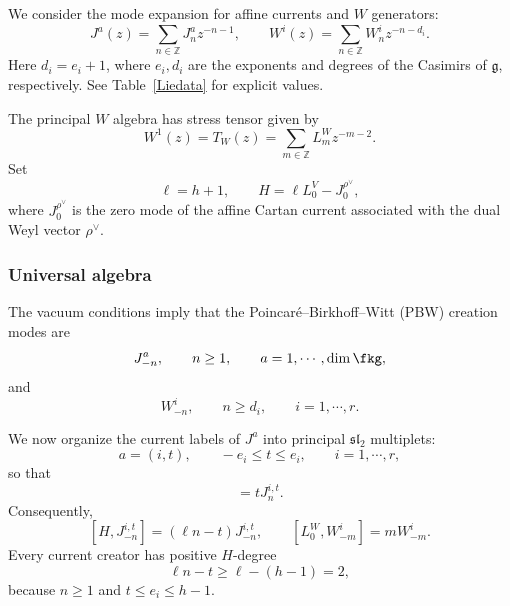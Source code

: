 \documentclass[a4paper,11pt]{article}
\theoremstyle{definition}
\theoremstyle{definition}
\theoremstyle{remark}
\newcommand{\be}{\begin{equation}}
\newcommand{\ee}{\end{equation}}
\begin{document}
We consider the mode expansion for affine currents and $W$ generators: 
\be
J^a(z)=\sum_{n\in\mathbb Z}J^a_nz^{-n-1},
\qquad
W^i(z)=\sum_{n\in\mathbb Z}W^i_n z^{-n-d_i}.
\ee
Here $d_i=e_i+1$, where $e_i,d_i$ are the exponents and degrees of the Casimirs of $ \mathfrak g$, respectively. See Table~\ref{Liedata} for explicit values.  

The principal $W$ algebra has stress tensor given by
\be
W^1(z)=T_W(z)=\sum_{m\in\mathbb Z}L_m^W z^{-m-2}. 
\ee
Set
\be \label{Hfsfsf}
\ell=h+1,\qquad
H=\ell L_0^V-J_0^{\rho^\vee},
\ee
where $J_0^{\rho^\vee}$ is the zero mode of the affine Cartan current associated with the dual Weyl vector $\rho^\vee$.
 

\subsubsection{Universal algebra}
The vacuum conditions imply that the Poincaré--Birkhoff--Witt (PBW) creation modes are
\be
J^a_{-n},\qquad n\ge1, \qquad a=1, \cdots , \dim\fkg,
\ee
and
\be
W^i_{-n},\qquad n\ge d_i, \qquad i=1, \cdots, r.
\ee
 
We now organize the current labels  of $J^a$ into principal $ \mathfrak{sl}_2$ multiplets:
\be
a=(i,t),\qquad -e_i\le t\le e_i, \qquad i=1, \cdots, r,
\ee
so that
\be
[J_0^{\rho^\vee},J_n^{i,t}]=tJ_n^{i,t}.
\ee
Consequently,
\be\label{HJLW}
[H,J^{i,t}_{-n}]= (\ell n-t)J^{i,t}_{-n},
\qquad
[L^W_0,W^i_{-m}]=mW^i_{-m}.
\ee
Every current creator has positive $ H$-degree 
\be
\ell n-t\ge \ell-(h-1)=2,
\ee
because $n\ge 1$ and $t\le e_i\le h-1$.
 
\end{document}
